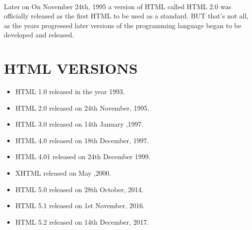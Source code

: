 \documentclass{article}
\begin{document}
\paragraph{}Later on
On November 24th, 1995 a version of HTML called HTML 2.0 was officially released as the first HTML to be used as a standard.
BUT that’s not all, as the years progressed later versions of the programming language began to be developed and released.


\section{HTML VERSIONS}
\begin{itemize}
	\item HTML 1.0 released in the year 1993.
	\item HTML 2.0 released on 24th November, 1995.
	\item HTML 3.0 released on 14th January ,1997.
	\item HTML 4.0 released on 18th December, 1997.
	\item HTML 4.01 released on 24th December 1999.
	\item XHTML released on May ,2000.
	\item HTML 5.0 released on 28th October, 2014.
	\item HTML 5.1 released on 1st November, 2016.
	\item HTML 5.2 released on 14th December, 2017.
	
\end{itemize}
\end{document}
